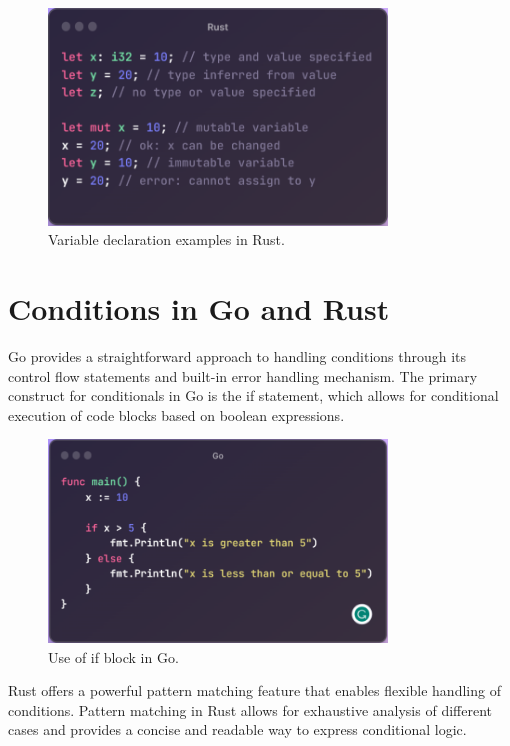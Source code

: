 \documentclass{dclass}
\begin{document}
\begin{figure}[h!]
\begin{center}
\includegraphics[width=9.0cm]{rust_variables.png}
\caption{Variable declaration examples in Rust.}
\label{fig1}
\end{center}\vs{-4mm}
\end{figure}

\section{Conditions in Go and Rust}

 Go provides a straightforward approach to handling conditions through its control flow statements and built-in error handling mechanism. The primary construct for conditionals in Go is the if statement, which allows for conditional execution of code blocks based on boolean expressions.\cite{ref5}\\

\begin{figure}[h!]
\begin{center}
\includegraphics[width=9.0cm]{go_conditions.png}
\caption{Use of if block in Go.}
\label{fig1}
\end{center}\vs{-4mm}
\end{figure}
Rust offers a powerful pattern matching feature that enables flexible handling of conditions. Pattern matching in Rust allows for exhaustive analysis of different cases and provides a concise and readable way to express conditional logic.\cite{ref6}\\
\newpage
\end{document}
